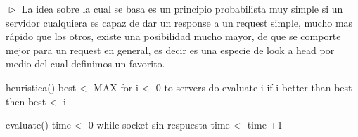 $\vartriangleright$ La idea sobre la cual se basa es un principio probabilista muy simple si un servidor cualquiera es capaz de dar un response a un
request simple, mucho mas rápido que los otros, existe una posibilidad mucho mayor, de que se  comporte mejor para un request en general,
es decir es una especie de look a head por medio del cual definimos un favorito.\\

\begin{verbatimtab}[\myTabs]
heuristica()
best <- MAX
for i <- 0 to servers
  do evaluate i
    if i better than best
      then best <- i


evaluate()
  time <- 0
  while socket sin respuesta
    time <- time +1
\end{verbatimtab}\\

